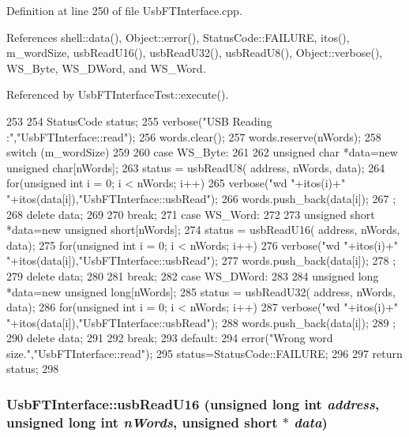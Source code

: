 Definition at line 250 of file UsbFTInterface.cpp.

References shell::data(), Object::error(), StatusCode::FAILURE, itos(), m\_\-wordSize, usbReadU16(), usbReadU32(), usbReadU8(), Object::verbose(), WS\_\-Byte, WS\_\-DWord, and WS\_\-Word.

Referenced by UsbFTInterfaceTest::execute().


\begin{DoxyCode}
253 {
254   StatusCode status;
255   verbose("USB Reading :","UsbFTInterface::read");
256   words.clear();
257   words.reserve(nWords);
258   switch (m_wordSize)
259   {
260   case WS_Byte:
261     {
262       unsigned char *data=new unsigned char[nWords];
263       status = usbReadU8( address, nWords, data);
264       for(unsigned int i = 0; i < nWords; i++){
265         verbose("wd "+itos(i)+" "+itos(data[i]),"UsbFTInterface::usbRead");
266         words.push_back(data[i]);
267       };
268       delete data;
269     }
270     break;
271   case WS_Word:
272     {
273       unsigned short *data=new unsigned short[nWords];
274       status = usbReadU16( address, nWords, data);
275       for(unsigned int i = 0; i < nWords; i++){
276         verbose("wd "+itos(i)+" "+itos(data[i]),"UsbFTInterface::usbRead");
277         words.push_back(data[i]);
278       };
279       delete data;
280     }
281     break;
282   case WS_DWord:
283     {
284       unsigned long *data=new unsigned long[nWords];
285       status = usbReadU32( address, nWords, data);
286       for(unsigned int i = 0; i < nWords; i++){
287         verbose("wd "+itos(i)+" "+itos(data[i]),"UsbFTInterface::usbRead");
288         words.push_back(data[i]);
289       };
290       delete data;
291     }
292     break;
293   default:
294     error("Wrong word size.","UsbFTInterface::read");
295     status=StatusCode::FAILURE;
296   }
297   return status;
298 }
\end{DoxyCode}
\hypertarget{classUsbFTInterface_ae17381a2ca14b9acac9faa10c3e430db}{
\subsubsection[{usbReadU16}]{ UsbFTInterface::usbReadU16 (unsigned long int {\em address}, \/  unsigned long int {\em nWords}, \/  unsigned short $\ast$ {\em data})}}
\label{classUsbFTInterface_ae17381a2ca14b9acac9faa10c3e430db}


